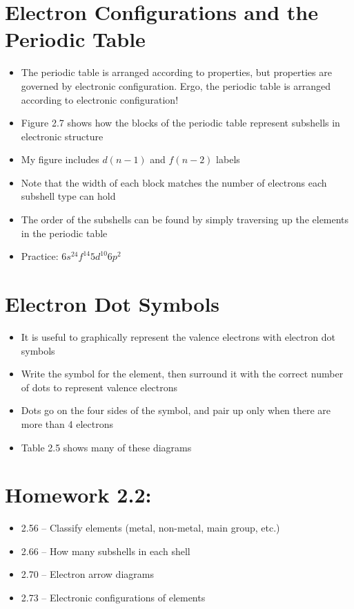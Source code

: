 \documentclass[12pt, openany, letterpaper]{memoir}
\begin{document}
\section{Electron Configurations and the Periodic Table}
\begin{itemize}
	\item The periodic table is arranged according to properties, but properties are governed by electronic configuration. Ergo, the periodic table is arranged according to electronic configuration!
	\item Figure 2.7 shows how the blocks of the periodic table represent subshells in electronic structure
	\item My figure includes $d(n-1)$ and $f(n-2)$ labels
	\item Note that the width of each block matches the number of electrons each subshell type can hold
	\item The order of the subshells can be found by simply traversing up the elements in the periodic table
	\item Practice: $6s^24f^{14}5d^{10}6p^2$
\end{itemize}
\section{Electron Dot Symbols}
\begin{itemize}
	\item It is useful to graphically represent the valence electrons with electron dot symbols
	\item Write the symbol for the element, then surround it with the correct number of dots to represent valence electrons
	\item Dots go on the four sides of the symbol, and pair up only when there are more than 4 electrons
	\item Table 2.5 shows many of these diagrams
\end{itemize}

\section*{Homework 2.2:}
\begin{itemize}
	\item 2.56 -- Classify elements (metal, non-metal, main group, etc.)
	\item 2.66 -- How many subshells in each shell
	\item 2.70 -- Electron arrow diagrams
	\item 2.73 -- Electronic configurations of elements
\end{itemize}
\end{document}
